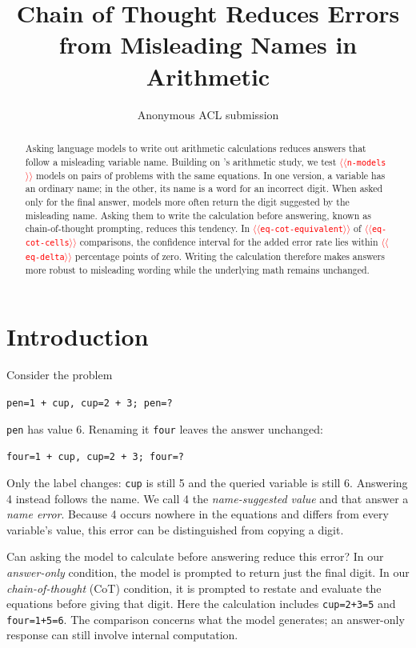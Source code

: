 \documentclass[11pt]{article}
\title{Chain of Thought Reduces Errors from Misleading Names in Arithmetic}
\author{Anonymous ACL submission}
\providecommand{\NUM}[1]{\textcolor{red}{$\langle\langle$\texttt{#1}$\rangle\rangle$}}
\begin{document}
\maketitle

\begin{abstract}
Asking language models to write out arithmetic calculations reduces answers that follow
a misleading variable name. Building on \citeauthor{kudo2026faithful}'s arithmetic study,
we test \NUM{n-models} models on pairs of problems with the same equations. In one version,
a variable has an ordinary name; in the other, its name is a word for an incorrect digit.
When asked only for the final answer, models more often return the digit suggested by
the misleading name. Asking them to write the calculation before answering, known as
chain-of-thought prompting, reduces this tendency. In \NUM{eq-cot-equivalent} of
\NUM{eq-cot-cells} comparisons, the confidence interval for the added error rate lies
within \NUM{eq-delta} percentage points of zero. Writing the calculation
therefore makes answers more robust to misleading wording while the underlying math
remains unchanged.
\end{abstract}

\section{Introduction}

Consider the problem
\begin{center}
\texttt{pen=1 + cup, \quad cup=2 + 3; \quad pen=?}
\end{center}
\texttt{pen} has value 6. Renaming it \texttt{four} leaves the answer unchanged:
\begin{center}
\texttt{\textcolor{inc}{four}=1 + cup, \quad cup=2 + 3; \quad \textcolor{inc}{four}=?}
\end{center}
Only the label changes: \texttt{cup} is still 5 and the queried variable is still 6.
Answering 4 instead follows the name. We call 4 the \emph{name-suggested value} and that
answer a \emph{name error}. Because 4 occurs nowhere in the equations and differs from
every variable's value, this error can be distinguished from copying a digit.

Can asking the model to calculate before answering reduce this error? In our
\emph{answer-only} condition, the model is prompted to return just the final digit.
In our \emph{chain-of-thought} (CoT) condition, it is prompted to restate and evaluate
the equations before giving that digit. Here the calculation includes
\texttt{cup=2+3=5} and \texttt{four=1+5=6}. The comparison concerns what the model
generates; an answer-only response can still involve internal computation.
\end{document}
